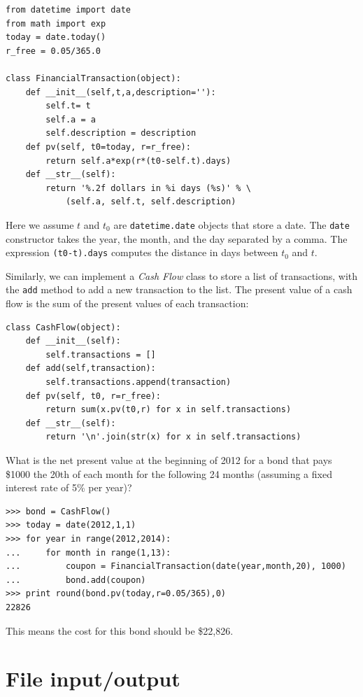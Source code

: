 \documentclass[justified,sixbynine]{tufte-book}
\def\ft{\small\tt}
\theoremstyle{plain}%
\theoremstyle{definition}
\theoremstyle{remark}
\begin{document}
\begin{fullwidth}
\begin{lstlisting}
from datetime import date
from math import exp
today = date.today()
r_free = 0.05/365.0

class FinancialTransaction(object):
    def __init__(self,t,a,description=''):
        self.t= t
        self.a = a
        self.description = description
    def pv(self, t0=today, r=r_free):
        return self.a*exp(r*(t0-self.t).days)
    def __str__(self):
        return '%.2f dollars in %i days (%s)' % \
            (self.a, self.t, self.description)
\end{lstlisting}

Here we assume $t$ and $t_0$ are {\ft datetime.date} objects that store a date. The {\ft date} constructor takes the year, the month, and the day separated by a comma. The expression {\ft (t0-t).days} computes the distance in days between $t_0$ and $t$.


Similarly, we can implement a {\it Cash Flow} class to store a list of transactions, with the {\ft add} method to add a new transaction to the list. The present value of a cash flow is the sum of the present values of each transaction:


\begin{lstlisting}
class CashFlow(object):
    def __init__(self):
        self.transactions = []
    def add(self,transaction):
        self.transactions.append(transaction)
    def pv(self, t0, r=r_free):
        return sum(x.pv(t0,r) for x in self.transactions)
    def __str__(self):
        return '\n'.join(str(x) for x in self.transactions)
\end{lstlisting}

What is the net present value at the beginning of 2012 for a bond that pays \$1000 the 20th of each month for the following 24 months (assuming a fixed interest rate of 5\% per year)?
\begin{lstlisting}
>>> bond = CashFlow()
>>> today = date(2012,1,1)
>>> for year in range(2012,2014):
...     for month in range(1,13):
...         coupon = FinancialTransaction(date(year,month,20), 1000)
...         bond.add(coupon)
>>> print round(bond.pv(today,r=0.05/365),0)
22826
\end{lstlisting}

This means the cost for this bond should be \$22,826.

\goodbreak\section{File input/output}
 


\end{fullwidth}
\end{document}
